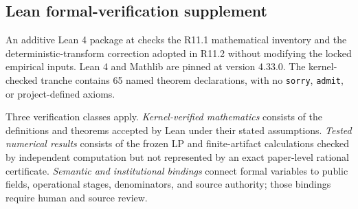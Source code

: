 \documentclass[11pt]{article}
\begin{document}
\subsection{Lean formal-verification supplement}

An additive Lean 4 package at  checks the R11.1 mathematical inventory and the deterministic-transform correction adopted in R11.2 without modifying the locked empirical inputs. Lean 4 and Mathlib are pinned at version 4.33.0. The kernel-checked tranche contains 65 named theorem declarations, with no \texttt{sorry}, \texttt{admit}, or project-defined axioms.

Three verification classes apply. \emph{Kernel-verified mathematics} consists of the definitions and theorems accepted by Lean under their stated assumptions. \emph{Tested numerical results} consists of the frozen LP and finite-artifact calculations checked by independent computation but not represented by an exact paper-level rational certificate. \emph{Semantic and institutional bindings} connect formal variables to public fields, operational stages, denominators, and source authority; those bindings require human and source review.
\end{document}
